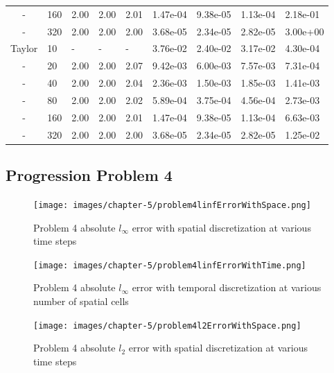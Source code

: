 \begin{table}[p]
{\begin{tabular}{cllllllll}
   - & 160 & 2.00 & 2.00 & 2.01 & 1.47e-04 & 9.38e-05 & 1.13e-04 & 2.18e-01 \\ 
   - & 320 & 2.00 & 2.00 & 2.00 & 3.68e-05 & 2.34e-05 & 2.82e-05 & 3.00e+00 \\ 
   \hline
   Taylor  &  10 & - & - & - & 3.76e-02 & 2.40e-02 & 3.17e-02 & 4.30e-04 \\ 
   -  &  20 & 2.00 & 2.00 & 2.07 & 9.42e-03 & 6.00e-03 & 7.57e-03 & 7.31e-04 \\ 
   -  &  40 & 2.00 & 2.00 & 2.04 & 2.36e-03 & 1.50e-03 & 1.85e-03 & 1.41e-03 \\ 
   -  &  80 & 2.00 & 2.00 & 2.02 & 5.89e-04 & 3.75e-04 & 4.56e-04 & 2.73e-03 \\ 
   -  & 160 & 2.00 & 2.00 & 2.01 & 1.47e-04 & 9.38e-05 & 1.13e-04 & 6.63e-03 \\ 
   -  & 320 & 2.00 & 2.00 & 2.00 & 3.68e-05 & 2.34e-05 & 2.82e-05 & 1.25e-02 \\ 
   \hline
   \end{tabular}
   }
\end{table}

\clearpage

\subsection{Progression Problem 4}
\begin{figure}[p]
    \centering
    \texttt{[image: images/chapter-5/problem4linfErrorWithSpace.png]}
    \caption{Problem 4 absolute $l_{\infty}$ error with spatial discretization at various time steps }
    \label{fig:problem4_linferror_spatial_results}
\end{figure}

\clearpage

\begin{figure}[p]
    \centering
    \texttt{[image: images/chapter-5/problem4linfErrorWithTime.png]}
    \caption{Problem 4 absolute $l_{\infty}$ error with temporal discretization at various number of spatial cells}
    \label{fig:problem4_linferror_time_results}
\end{figure}


\begin{figure}[p]
    \centering
    \texttt{[image: images/chapter-5/problem4l2ErrorWithSpace.png]}
    \caption{Problem 4 absolute $l_{2}$ error with spatial discretization at various time steps }
    \label{fig:problem4_l2error_spatial_results}
\end{figure}

